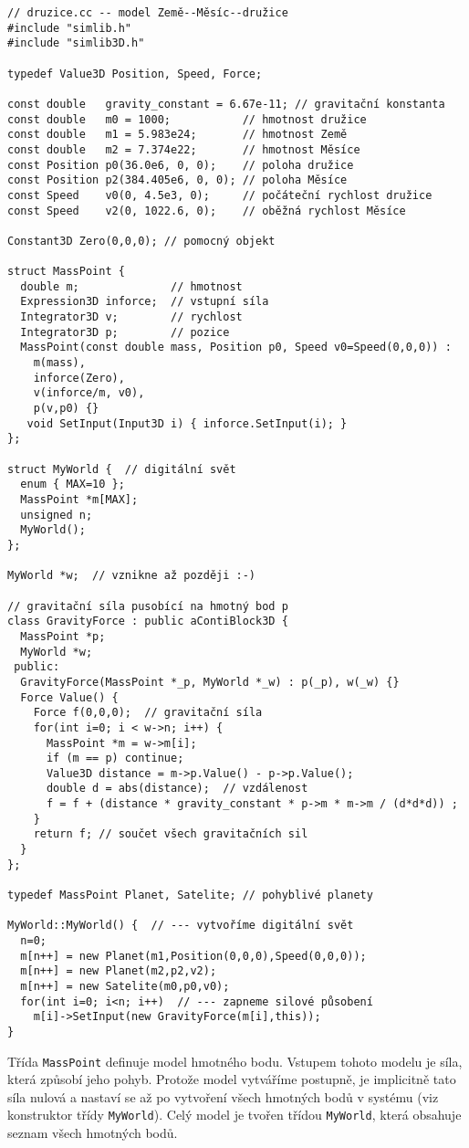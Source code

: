 \documentclass[a4paper]{article}
\begin{document}
{
\small
\begin{verbatim}
// druzice.cc -- model Země--Měsíc--družice
#include "simlib.h"
#include "simlib3D.h"

typedef Value3D Position, Speed, Force;

const double   gravity_constant = 6.67e-11; // gravitační konstanta
const double   m0 = 1000;           // hmotnost družice
const double   m1 = 5.983e24;       // hmotnost Země
const double   m2 = 7.374e22;       // hmotnost Měsíce
const Position p0(36.0e6, 0, 0);    // poloha družice
const Position p2(384.405e6, 0, 0); // poloha Měsíce
const Speed    v0(0, 4.5e3, 0);     // počáteční rychlost družice
const Speed    v2(0, 1022.6, 0);    // oběžná rychlost Měsíce

Constant3D Zero(0,0,0); // pomocný objekt

struct MassPoint {
  double m;              // hmotnost
  Expression3D inforce;  // vstupní síla
  Integrator3D v;        // rychlost
  Integrator3D p;        // pozice
  MassPoint(const double mass, Position p0, Speed v0=Speed(0,0,0)) :
    m(mass),
    inforce(Zero),
    v(inforce/m, v0),
    p(v,p0) {}
   void SetInput(Input3D i) { inforce.SetInput(i); }
};

struct MyWorld {  // digitální svět
  enum { MAX=10 };
  MassPoint *m[MAX];
  unsigned n;
  MyWorld();
};

MyWorld *w;  // vznikne až později :-)

// gravitační síla pusobící na hmotný bod p
class GravityForce : public aContiBlock3D {
  MassPoint *p;
  MyWorld *w;
 public:
  GravityForce(MassPoint *_p, MyWorld *_w) : p(_p), w(_w) {}
  Force Value() {
    Force f(0,0,0);  // gravitační síla
    for(int i=0; i < w->n; i++) {
      MassPoint *m = w->m[i];
      if (m == p) continue;
      Value3D distance = m->p.Value() - p->p.Value();
      double d = abs(distance);  // vzdálenost
      f = f + (distance * gravity_constant * p->m * m->m / (d*d*d)) ;
    }
    return f; // součet všech gravitačních sil
  }
};

typedef MassPoint Planet, Satelite; // pohyblivé planety

MyWorld::MyWorld() {  // --- vytvoříme digitální svět
  n=0;
  m[n++] = new Planet(m1,Position(0,0,0),Speed(0,0,0));
  m[n++] = new Planet(m2,p2,v2);
  m[n++] = new Satelite(m0,p0,v0);
  for(int i=0; i<n; i++)  // --- zapneme silové působení
    m[i]->SetInput(new GravityForce(m[i],this));
}
\end{verbatim}
}

Třída \verb|MassPoint| definuje model hmotného bodu. Vstupem tohoto modelu je
síla, která způsobí jeho pohyb. Protože model vytváříme postupně, je
implicitně tato síla nulová a nastaví se až po vytvoření všech hmotných bodů v
systému (viz konstruktor třídy \verb|MyWorld|). Celý model je tvořen třídou
\verb|MyWorld|,
která obsahuje seznam všech hmotných bodů.
\end{document}
